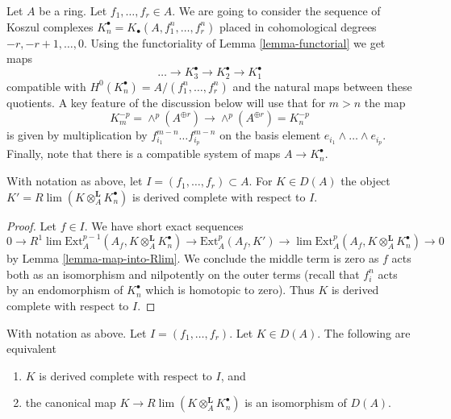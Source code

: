\noindent
Let $A$ be a ring. Let $f_1, \ldots, f_r \in A$. We are going
to consider the sequence of Koszul complexes
$K_n^\bullet = K_\bullet(A, f_1^n, \ldots, f_r^n)$
placed in cohomological degrees $-r, -r + 1, \ldots, 0$.
Using the functoriality of Lemma \ref{lemma-functorial}
we get maps
$$
\ldots \to K_3^\bullet \to K_2^\bullet \to K_1^\bullet
$$
compatible with $H^0(K_n^\bullet) = A/(f_1^n, \ldots, f_r^n)$
and the natural maps between these quotients. A key feature of the
discussion below will use that for $m > n$ the map
$$
K_m^{-p} = \wedge^p(A^{\oplus r}) \to \wedge^p(A^{\oplus r}) = K_n^{-p}
$$
is given by multiplication by $f_{i_1}^{m - n} \ldots f_{i_p}^{m - n}$
on the basis element $e_{i_1} \wedge \ldots \wedge e_{i_p}$.
Finally, note that there is a compatible system of maps $A \to K_n^\bullet$.

\begin{lemma}
\label{lemma-koszul-derived-completion-complete}
With notation as above, let $I = (f_1, \ldots, f_r) \subset A$. For
$K \in D(A)$ the object $K' = R\lim (K \otimes_A^\mathbf{L} K_n^\bullet)$
is derived complete with respect to $I$.
\end{lemma}

\begin{proof}
Let $f \in I$. We have short exact sequences
$$
0 \to
R^1\lim \text{Ext}^{p - 1}_A(A_f, K \otimes_A^\mathbf{L} K_n^\bullet) \to
\text{Ext}^p_A(A_f, K') \to
\lim \text{Ext}^p_A(A_f, K \otimes_A^\mathbf{L} K_n^\bullet) \to 0
$$
by Lemma \ref{lemma-map-into-Rlim}. We conclude the middle term is zero
as $f$ acts both as an isomorphism and nilpotently on the outer terms
(recall that $f_i^n$ acts by an endomorphism of $K_n^\bullet$ which is
homotopic to zero). Thus $K$ is derived complete with respect to $I$.
\end{proof}

\begin{lemma}
\label{lemma-characterize-derived-complete-Koszul}
With notation as above. Let $I = (f_1, \ldots, f_r)$.
Let $K \in D(A)$. The following are equivalent
\begin{enumerate}
\item $K$ is derived complete with respect to $I$, and
\item the canonical map $K \to R\lim (K \otimes_A^\mathbf{L} K_n^\bullet)$
is an isomorphism of $D(A)$.
\end{enumerate}
\end{lemma}

